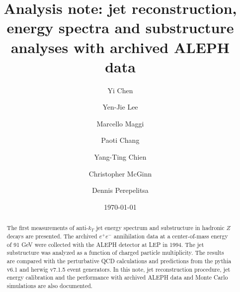 \documentclass[aps,superscriptaddress,groupedaddress,12pt]{article}
\begin{document}

\title{Analysis note: jet reconstruction, energy spectra and substructure analyses with archived ALEPH data}

\author[1]{Yi Chen}
\author[1]{Yen-Jie Lee}
\author[2]{Marcello Maggi}
\author[3]{Paoti Chang}
\author[4]{Yang-Ting Chien}
\author[5]{Christopher McGinn}
\author[5]{Dennis Perepelitsa}


%
%
%
%

\date{\today}

\maketitle


\begin{abstract}
The first measurements of anti-$k_{T}$ jet energy spectrum and substructure in hadronic $Z$ decays are presented. The archived $e^+e^-$ annihilation data at a center-of-mass energy of 91 GeV were collected with the ALEPH detector at LEP in 1994. The jet substructure was analyzed as a function of charged particle multiplicity. The results are compared with the perturbative QCD calculations and predictions from the {\sc pythia} v6.1 and {\sc herwig} v7.1.5 event generators. In this note, jet reconstruction procedure, jet energy calibration and the performance with archived ALEPH data and Monte Carlo simulations are also documented.
\end{abstract}


\newcommand{\ak}{anti-k$_\text{T}$\xspace}
\newcommand{\ee}{$e^+e^-$\xspace}
\newcommand{\fastjet}{\textsc{FastJet}\xspace}
\newcommand{\sd}{\textsc{SoftDrop}\xspace}
\newcommand{\zg}{\ensuremath{z_G}\xspace}
\newcommand{\Rg}{\ensuremath{R_G}\xspace}
\newcommand{\ME}{\ensuremath{M/E}\xspace}
\newcommand{\MgE}{\ensuremath{M_G/E}\xspace}
\newcommand{\Bayes}{\texttt{BayesUnfold}\xspace}
\newcommand{\SVD}{\texttt{SVDUnfold}\xspace}
\newcommand{\includegraphicsfour}[1]{\texttt{[image: \#1]}}
\newcommand{\includegraphicsthree}[1]{\texttt{[image: \#1]}}
\newcommand{\includegraphicstwo}[1]{\texttt{[image: \#1]}}
\newcommand{\includegraphicsone}[1]{\texttt{[image: \#1]}}
\newcommand{\includegraphicsonewide}[1]{\texttt{[image: \#1]}}
\newcommand{\includegraphicsonesmall}[1]{\texttt{[image: \#1]}}
\newcommand{\HybridE}{\ensuremath{E_\text{sum}^\text{hybrid}}\xspace}
\newcommand{\fixme}[1]{{\color{red} \textbf{#1}}}
\newcommand{\followup}[1]{{\color{magenta} {#1}}}
\clearpage
\end{document}
